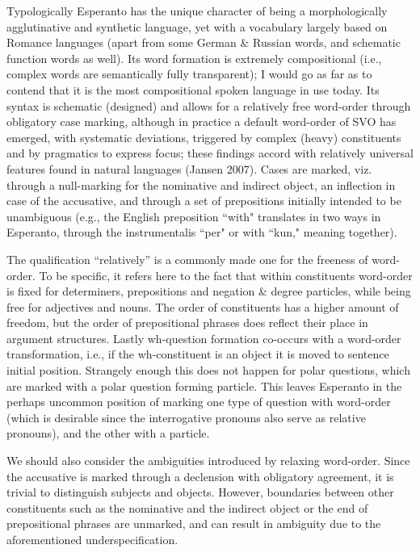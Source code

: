 \documentclass[10pt,a4paper]{article}
\begin{document}
Typologically Esperanto has the unique character of being a morphologically
agglutinative and synthetic language, yet with a vocabulary largely based on
Romance languages (apart from some German \& Russian words, and schematic
function words as well). Its word formation is extremely compositional (i.e.,
complex words are semantically fully transparent); I would go as far as to
contend that it is the most compositional spoken language in use today. Its
syntax is schematic (designed) and allows for a relatively free word-order
through obligatory case marking, although in practice a default word-order of
SVO has emerged, with systematic deviations, triggered by complex (heavy)
constituents and by pragmatics to express focus; these findings accord with
relatively universal features found in natural languages (Jansen 2007). Cases
are marked, viz. through a null-marking for the nominative and indirect object,
an inflection in case of the accusative, and through a set of prepositions
initially intended to be unambiguous (e.g., the English preposition ``with"
translates in two ways in Esperanto, through the instrumentalis ``per" or with
``kun," meaning together). 

The qualification ``relatively'' is a commonly made one for the freeness of
word-order. To be specific, it refers here to the fact that within
constituents word-order is fixed for determiners, prepositions and negation
\& degree particles, while being free for adjectives and nouns. The order of
constituents has a higher amount of freedom, but the order of prepositional
phrases does reflect their place in argument structures. Lastly wh-question formation
co-occurs with a word-order transformation, i.e., if the wh-constituent is an
object it is moved to sentence initial position.  Strangely enough
this does not happen for polar questions, which are marked with a
polar question forming particle. This leaves Esperanto in the perhaps uncommon position
of marking one type of question with word-order (which is desirable since the
interrogative pronouns also serve as relative pronouns), and the other with a particle.

We should also consider the ambiguities introduced by relaxing word-order.
Since the accusative is marked through a declension with obligatory agreement,
it is trivial to distinguish subjects and objects. However, boundaries between
other constituents such as the nominative and the indirect object or the end of
prepositional phrases are unmarked, and can result in ambiguity due to the
aforementioned underspecification.
\end{document}
